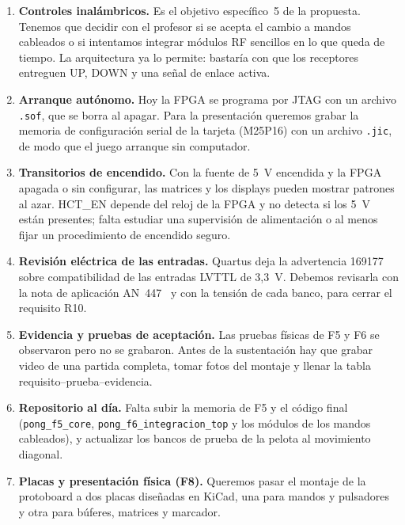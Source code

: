 \documentclass[conference,a4paper]{IEEEtran}
\begin{document}
\begin{enumerate}
\item \textbf{Controles inalámbricos.} Es el objetivo específico~5 de la propuesta. Tenemos que decidir con el profesor si se acepta el cambio a mandos cableados o si intentamos integrar módulos RF sencillos en lo que queda de tiempo. La arquitectura ya lo permite: bastaría con que los receptores entreguen UP, DOWN y una señal de enlace activa.
\item \textbf{Arranque autónomo.} Hoy la FPGA se programa por JTAG con un archivo \texttt{.sof}, que se borra al apagar. Para la presentación queremos grabar la memoria de configuración serial de la tarjeta (M25P16) con un archivo \texttt{.jic}, de modo que el juego arranque sin computador.
\item \textbf{Transitorios de encendido.} Con la fuente de 5~V encendida y la FPGA apagada o sin configurar, las matrices y los displays pueden mostrar patrones al azar. HCT\_EN depende del reloj de la FPGA y no detecta si los 5~V están presentes; falta estudiar una supervisión de alimentación o al menos fijar un procedimiento de encendido seguro.
\item \textbf{Revisión eléctrica de las entradas.} Quartus deja la advertencia 169177 sobre compatibilidad de las entradas LVTTL de 3,3~V. Debemos revisarla con la nota de aplicación AN~447~\cite{an447} y con la tensión de cada banco, para cerrar el requisito R10.
\item \textbf{Evidencia y pruebas de aceptación.} Las pruebas físicas de F5 y F6 se observaron pero no se grabaron. Antes de la sustentación hay que grabar video de una partida completa, tomar fotos del montaje y llenar la tabla requisito--prueba--evidencia.
\item \textbf{Repositorio al día.} Falta subir la memoria de F5 y el código final (\texttt{pong\_f5\_core}, \texttt{pong\_f6\_integracion\_top} y los módulos de los mandos cableados), y actualizar los bancos de prueba de la pelota al movimiento diagonal.
\item \textbf{Placas y presentación física (F8).} Queremos pasar el montaje de la protoboard a dos placas diseñadas en KiCad, una para mandos y pulsadores y otra para búferes, matrices y marcador.
\end{enumerate}
\end{document}
